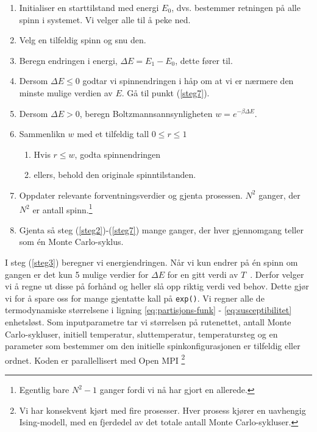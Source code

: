 \documentclass[11pt]{article}
\begin{document}
\begin{enumerate}
\item Initialiser en starttilstand med energi $E_0$, dvs. bestemmer retningen på
  alle spinn i systemet. Vi velger alle til å peke ned.
\item Velg en tilfeldig spinn og snu den.\label{steg2}
\item Beregn endringen i energi, $\Delta E = E_1-E_0$, dette fører til.\label{steg3} 
\item Dersom $\Delta E \leq 0$ godtar vi spinnendringen i håp om at vi
  er nærmere den minste mulige verdien av $E$. Gå til punkt (\ref{steg7}).
\item Dersom $\Delta E > 0 $, beregn Boltzmannsannsynligheten $w = e^{-\beta\Delta E}$. 
\item Sammenlikn $w$ med et tilfeldig tall $0\leq r\leq 1$ \label{steg6}
\begin{enumerate}
  \item Hvis $r\leq w$, godta spinnendringen
  \item ellers, behold den originale spinntilstanden.
\end{enumerate}
\item Oppdater relevante forventningsverdier og gjenta prosessen.\label{steg7}
  $N^2$ ganger, der $N^2$ er antall spinn.\footnote{Egentlig bare $N^2-1$ ganger fordi vi nå har gjort en
  allerede.}
\item Gjenta så steg (\ref{steg2})-(\ref{steg7}) mange ganger, der hver gjennomgang teller som
  én Monte Carlo-syklus.
\end{enumerate}

I steg (\ref{steg3}) beregner vi energiendringen. Når vi kun endrer på
én spinn om gangen er det kun 5 mulige verdier for $\Delta E$ for en
gitt verdi av $T$~\cite[s. 436]{Lecture-notes}. Derfor velger vi å
regne ut disse på forhånd og heller slå opp riktig verdi ved
behov. Dette gjør vi for å spare oss for mange gjentatte kall på \texttt{exp()}. Vi regner alle de termodynamiske størrelsene
i ligning \eqref{eq:partisjons-funk} - \eqref{eq:susceptibilitet} enhetsløst. 
 Som inputparametre tar vi størrelsen på rutenettet, antall Monte Carlo-sykluser,
initiell temperatur, sluttemperatur, temperatursteg og en parameter som bestemmer om den initielle
spinkonfigurasjonen er tilfeldig eller ordnet. Koden er parallellisert med Open MPI \footnote{Vi har konsekvent kjørt med fire
prosesser. Hver prosess kjører en uavhengig Ising-modell, med en fjerdedel av det totale antall Monte Carlo-sykluser. }
\end{document}
